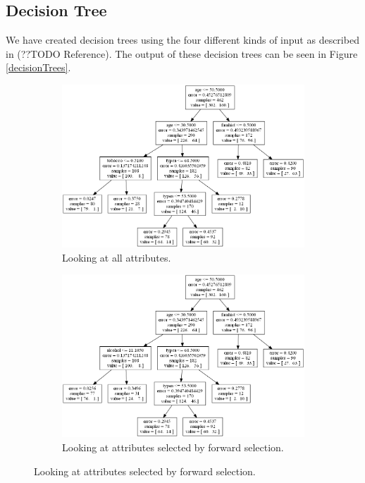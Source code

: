 \subsection{Decision Tree}

We have created decision trees using the four different kinds of input as described in (??TODO Reference). The output of these decision trees can be seen in Figure \ref{decisionTrees}.

\begin{figure}
	\begin{subfigure}[b]{0.5\textwidth}
	\includegraphics[scale=0.2]{pictures/Decision_Tree_X.png}
	\caption{Looking at all attributes.}
	\label{decisionTreeX}
	\end{subfigure}
	\begin{subfigure}[b]{0.5\textwidth}
	\includegraphics[scale=0.2]{pictures/Decision_Tree_Xad.png}	
	\caption{Looking at attributes selected by forward selection.}
	\label{decisionTreeXad}
	\end{subfigure}


\end{figure}
